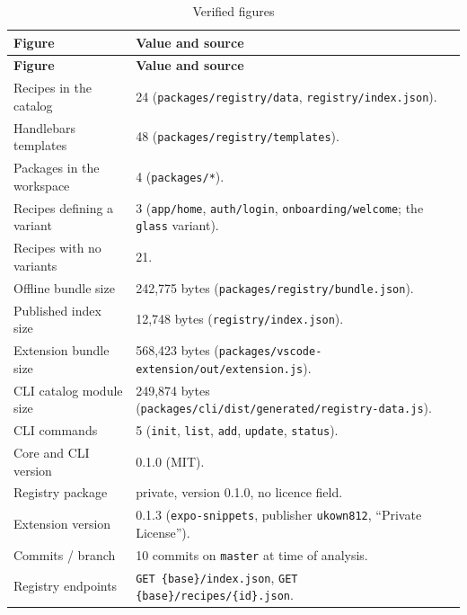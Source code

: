 \begin{longtable}{@{}L{6cm}L{8.2cm}@{}}
\caption{Verified figures}\\
\toprule
\textbf{Figure} & \textbf{Value and source} \\
\midrule
\endfirsthead
\toprule
\textbf{Figure} & \textbf{Value and source} \\
\midrule
\endhead
Recipes in the catalog & 24 (\texttt{packages/registry/data}, \texttt{registry/index.json}). \\
Handlebars templates & 48 (\texttt{packages/registry/templates}). \\
Packages in the workspace & 4 (\texttt{packages/*}). \\
Recipes defining a variant & 3 (\texttt{app/home}, \texttt{auth/login},
\texttt{onboarding/welcome}; the \texttt{glass} variant). \\
Recipes with no variants & 21. \\
Offline bundle size & 242{,}775 bytes (\texttt{packages/registry/bundle.json}). \\
Published index size & 12{,}748 bytes (\texttt{registry/index.json}). \\
Extension bundle size & 568{,}423 bytes
(\texttt{packages/vscode-extension/out/extension.js}). \\
CLI catalog module size & 249{,}874 bytes
(\texttt{packages/cli/dist/generated/registry-data.js}). \\
CLI commands & 5 (\texttt{init}, \texttt{list}, \texttt{add}, \texttt{update},
\texttt{status}). \\
Core and CLI version & 0.1.0 (MIT). \\
Registry package & private, version 0.1.0, no licence field. \\
Extension version & 0.1.3 (\texttt{expo-snippets}, publisher \texttt{ukown812},
``Private License''). \\
Commits / branch & 10 commits on \texttt{master} at time of analysis. \\
Registry endpoints & \texttt{GET \{base\}/index.json},
\texttt{GET \{base\}/recipes/\{id\}.json}. \\
\bottomrule
\end{longtable}
